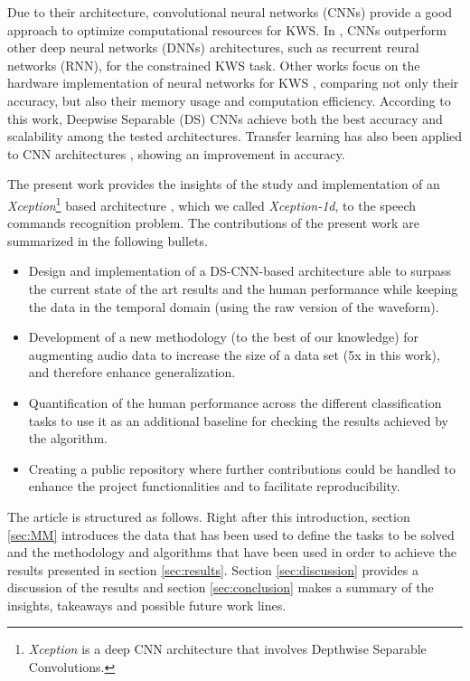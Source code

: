 \documentclass[review]{elsarticle}
\begin{document}
Due to their architecture, convolutional neural networks (CNNs) provide a good approach to optimize computational resources for KWS. In \cite{Tara2015}, CNNs outperform other deep neural networks (DNNs) architectures, such as recurrent reural networks (RNN), for the constrained KWS task. Other works focus on the hardware implementation of neural networks for KWS \cite{Zhang2017}, comparing not only their accuracy, but also their memory usage and computation efficiency. According to this work, Deepwise Separable (DS) CNNs achieve both the best accuracy and scalability among the tested architectures.  Transfer learning has also been applied to CNN architectures \cite{McMahan2018}, showing an improvement in accuracy.

The present work provides the insights of the study and implementation of an \textit{Xception}\footnote{\textit{Xception} is a deep CNN architecture that involves Depthwise Separable Convolutions.} based architecture \cite{FChollet2017}, which we called \textit{Xception-1d}, to the speech commands recognition problem.  The contributions of the present work are summarized in the following bullets.
 
 \begin{itemize}
 	\item Design and implementation of a DS-CNN-based architecture able to surpass the current state of the art results and the human performance while keeping the data in the temporal domain (using the raw version of the waveform).
 	 	
 	\item Development of a new methodology (to the best of our knowledge) for augmenting audio data to increase the size of a data set (5x in this work), and therefore enhance generalization. 
 	
 	\item Quantification of the human performance across the different classification tasks to use it as an additional baseline for checking the results achieved by the algorithm.
 	
	\item Creating a public repository where further contributions could be handled to enhance the project functionalities and to facilitate reproducibility.
 \end{itemize}
 
 The article is structured as follows. Right after this introduction, section \ref{sec:MM} introduces the data that has been used to define the tasks to be solved and the methodology and algorithms that have been used in order to achieve the results presented in section \ref{sec:results}. Section \ref{sec:discussion} provides a discussion of the results and section \ref{sec:conclusion} makes a summary of the insights, takeaways and possible future work lines.
  
\end{document}
